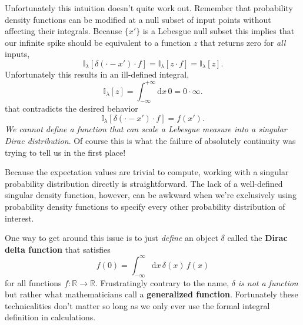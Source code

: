 \documentclass[
  letterpaper,
  DIV=11,
  numbers=noendperiod]{scrartcl}
\begin{document}
Unfortunately this intuition doesn't quite work out. Remember that
probability density functions can be modified at a null subset of input
points without affecting their integrals. Because \(\{ x' \}\) is a
Lebesgue null subset this implies that our infinite spike should be
equivalent to a function \(z\) that returns zero for \emph{all} inputs,
\[
\mathbb{I}_{\lambda} [ \delta(\cdot - x') \cdot f]
=
\mathbb{I}_{\lambda} [ z \cdot f]
=
\mathbb{I}_{\lambda} [ z ].
\] Unfortunately this results in an ill-defined integral, \[
\mathbb{I}_{\lambda} [ z ]
= \int_{-\infty}^{+\infty} \mathrm{d} x \, 0
= 0 \cdot \infty.
\] that contradicts the desired behavior \[
\mathbb{I}_{\lambda} [ \delta(\cdot - x') \cdot f] = f(x').
\] \emph{We cannot define a function that can scale a Lebesgue measure
into a singular Dirac distribution}. Of course this is what the failure
of absolutely continuity was trying to tell us in the first place!

Because the expectation values are trivial to compute, working with a
singular probability distribution directly is straightforward. The lack
of a well-defined singular density function, however, can be awkward
when we're exclusively using probability density functions to specify
every other probability distribution of interest.

One way to get around this issue is to just \emph{define} an object
\(\delta\) called the \textbf{Dirac delta function} that satisfies \[
f(0)
= \int_{-\infty}^{\infty} \mathrm{d} x \, \delta(x) \, f(x)
\] for all functions \(f : \mathbb{R} \rightarrow \mathbb{R}\).
Frustratingly contrary to the name, \(\delta\) \emph{is not a function}
but rather what mathematicians call a \textbf{generalized function}.
Fortunately these technicalities don't matter so long as we only ever
use the formal integral definition in calculations.
\end{document}
